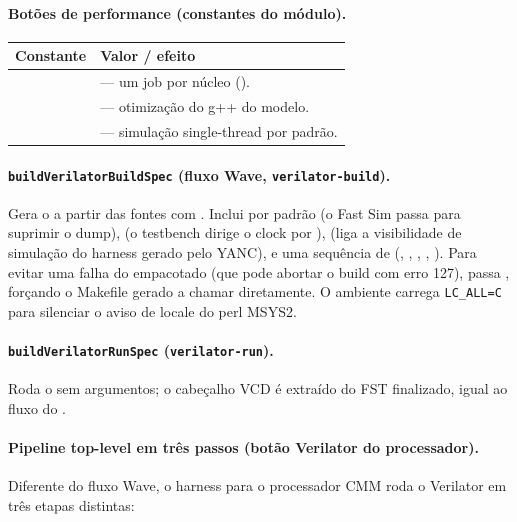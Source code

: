 \paragraph{Botões de performance (constantes do módulo).}

\begin{tabularx}{\linewidth}{Y Y}
  \toprule
  \textbf{Constante} & \textbf{Valor / efeito} \\
  \midrule
   &  — um job por núcleo (). \\
    &  — otimização do g++ do modelo. \\
  &  — simulação single-thread por padrão. \\
  \bottomrule
\end{tabularx}

\paragraph{\texttt{buildVerilatorBuildSpec} (fluxo Wave, \texttt{verilator-build}).}
Gera o  a partir das fontes com . Inclui
 por padrão (o Fast Sim passa  para suprimir
o dump),  (o testbench dirige o clock por ),
 (liga a visibilidade de simulação do harness gerado
pelo YANC), e uma sequência de  (, ,
, , ). Para evitar uma
falha do  empacotado (que pode abortar o build com erro 127), passa
, forçando o Makefile gerado a chamar 
diretamente. O ambiente carrega \lstinline|LC_ALL=C| para silenciar o aviso de
locale do perl MSYS2.

\paragraph{\texttt{buildVerilatorRunSpec} (\texttt{verilator-run}).}
Roda o  sem argumentos; o cabeçalho VCD é extraído do FST
finalizado, igual ao fluxo do .

\paragraph{Pipeline top-level em três passos (botão Verilator do processador).}
Diferente do fluxo Wave, o harness para o processador CMM roda o Verilator em
três etapas distintas:

